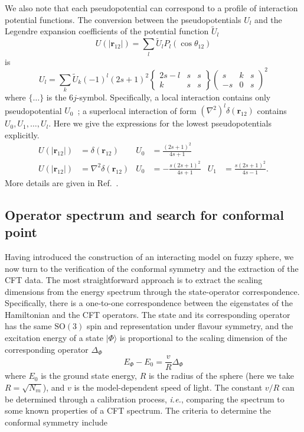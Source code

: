 \documentclass{timesjhep}
\begin{document}
We also note that each pseudopotential can correspond to a profile of interaction potential functions. The conversion between the pseudopotentials $U_l$ and the Legendre expansion coefficients of the potential function $\tilde{U}_l$
\begin{equation}
    U(|\mathbf{r}_{12}|)=\sum_l\tilde{U}_lP_l(\cos\theta_{12})
\end{equation} 
is 
\begin{equation} 
    U_l=\sum_k \tilde{U}_k(-1)^l(2s+1)^2\begin{Bmatrix}2s-l&s&s\\k&s&s\end{Bmatrix}\begin{pmatrix}s&k&s\\-s&0&s\end{pmatrix}^2 
\end{equation}
where $\{\dots\}$ is the $6j$-symbol. Specifically, a local interaction contains only pseudopotential $U_0$~; a superlocal interaction of form $(\nabla^2)^l\delta(\mathbf{r}_{12})$ contains $U_0,U_1,\dots,U_l$. Here we give the expressions for the lowest pseudopotentials explicitly. 
\begin{align}
    U(|\mathbf{r}_{12}|)&=\delta(\mathbf{r}_{12})&U_0&=\frac{(2s+1)^2}{4s+1}\nonumber\\
    U(|\mathbf{r}_{12}|)&=\nabla^2\delta(\mathbf{r}_{12})&U_0&=-\frac{s(2s+1)^2}{4s+1}&U_1&=\frac{s(2s+1)^2}{4s-1}.
\end{align}
More details are given in Ref.~\cite{Fan2024}. 

\subsection{Operator spectrum and search for conformal point}
\label{sec:construct_spec}

Having introduced the construction of an interacting model on fuzzy sphere, we now turn to the verification of the conformal symmetry and the extraction of the CFT data. The most straightforward approach is to extract the scaling dimensions from the energy spectrum through the state-operator correspondence. Specifically, there is a one-to-one correspondence between the eigenstates of the Hamiltonian and the CFT operators. The state and its corresponding operator has the same $\mathrm{SO}(3)$ spin and representation under flavour symmetry, and the excitation energy of a state $|\Phi\rangle$ is proportional to the scaling dimension of the corresponding operator $\Delta_\Phi$ 
\begin{equation}
    E_\Phi-E_0=\frac{v}{R}\Delta_\Phi
\end{equation}
where $E_0$ is the ground state energy, $R$ is the radius of the sphere (here we take $R=\sqrt{N_m}$), and $v$ is the model-dependent speed of light. The constant $v/R$ can be determined through a calibration process, \textit{i.e.}, comparing the spectrum to some known properties of a CFT spectrum. The criteria to determine the conformal symmetry include 
\end{document}
